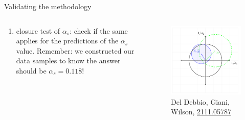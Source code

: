 \documentclass[8pt,t]{beamer}
\begin{document}
\begin{frame}{Validating the methodology}
\begin{columns}
\begin{column}{0.49\textwidth}
\begin{enumerate}
        \item closure test of $\alpha_s$: check if the same applies for the predictions of the $\alpha_s$ value. Remember: we constructed our data samples to know the answer should be $\alpha_s = 0.118$!
      \end{enumerate}
    \end{column}
    \begin{column}{0.49\textwidth}
      \begin{figure}
        \includegraphics[width=0.99\textwidth]{geometric_closure_test.png}
        \caption*{\color{gray} \footnotesize Del Debbio, Giani, Wilson, \hyperlink{https://arxiv.org/abs/2111.05787}{2111.05787}}

      \end{figure}
    \end{column}
  \end{columns}

  \begin{center}
    \vspace*{1em}
  \end{center}
\end{frame}
\end{document}
